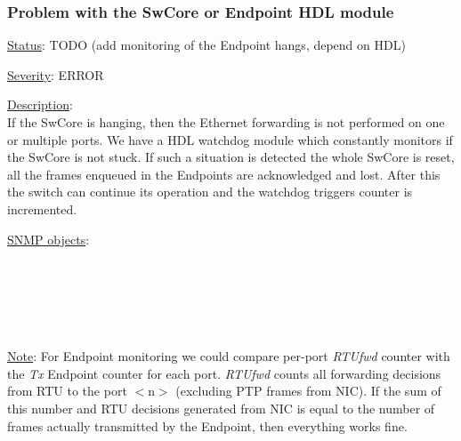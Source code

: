 \subsubsection{\bf Problem with the SwCore or Endpoint HDL module}
		\label{fail:data:swcore_hang}
		\begin{pck_descr}
    \item [] \underline{Status}: TODO (add monitoring of the Endpoint hangs, depend on
      HDL)
			\item [] \underline{Severity}: ERROR
			\item [] \underline{Description}:\\
				If the SwCore is hanging, then the Ethernet forwarding is not
				performed on one or multiple ports. We have a HDL watchdog module which
				constantly monitors if the SwCore is not stuck. If such a situation is
				detected the whole SwCore is reset, all the frames enqueued in the
				Endpoints are acknowledged and lost. After this the switch can continue
				its operation and the watchdog triggers counter is incremented.
			\item [] \underline{SNMP objects}:\\
				\\
				\\
				\\
				\\
				\\
			\item [] \underline{Note}: For Endpoint monitoring we could compare
				per-port \emph{RTUfwd} counter with the \emph{Tx} Endpoint counter for
				each port. \emph{RTUfwd} counts all forwarding decisions from RTU to the
				port $<$n$>$ (excluding PTP frames from NIC). If the sum of this number
				and RTU decisions generated from NIC is equal to the number of frames
				actually transmitted by the Endpoint, then everything works fine.
		\end{pck_descr}

